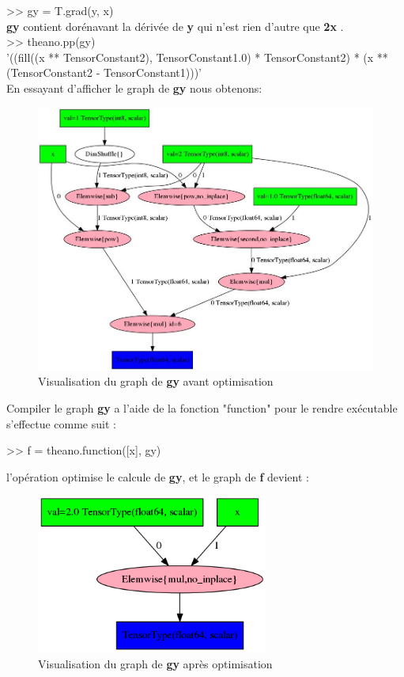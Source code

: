 >> gy = T.grad(y, x)\\

\textbf{gy} contient dorénavant la dérivée de \textbf{y} qui n'est rien d'autre que \textbf{2x} .\\

>> theano.pp(gy)\\
 '((fill((x ** TensorConstant{2}), TensorConstant{1.0}) * TensorConstant{2}) * (x ** (TensorConstant{2} - TensorConstant{1})))'\\
 
En essayant d'afficher le graph de \textbf{gy} nous obtenons:

\begin{figure}[H]
	\centering
		\includegraphics[width=5in]{Figures/beforeOptimization.png}
	\caption[TheanoGraph]{Visualisation du graph de \textbf{gy} avant optimisation}
	\label{fig:Electron}
\end{figure}

Compiler le graph \textbf{gy} a l'aide de la fonction "function" pour le rendre exécutable s'effectue comme suit :

>> f = theano.function([x], gy)

l’opération optimise le calcule de \textbf{gy}, et le graph de \textbf{f} devient :

\begin{figure}[H]
	\centering
		\includegraphics[width=3in]{Figures/afterOptimization.png}
	\caption[TheanoGraph]{Visualisation du graph de \textbf{gy} après optimisation}
	\label{fig:Electron}
\end{figure}
 
